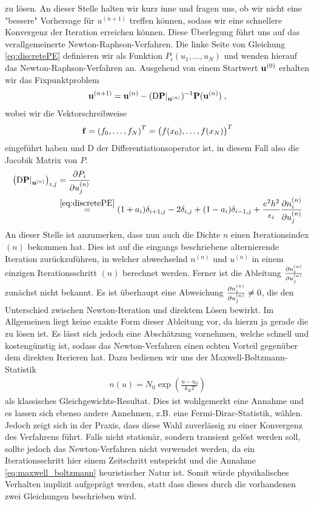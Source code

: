 zu lösen. An dieser Stelle halten wir kurz inne und fragen uns, ob wir nicht eine "bessere" Vorhersage für $u^{(n+1)}$ treffen können, sodass wir eine schnellere Konvergenz der Iteration erreichen können. Diese Überlegung führt uns auf das verallgemeinerte Newton-Raphson-Verfahren.
Die linke Seite von Gleichung \eqref{eq:discretePE} definieren wir als Funktion $P_i(u_1,\dots,u_N)$ und wenden hierauf das Newton-Raphson-Verfahren an. Ausgehend von einem Startwert $\vb{u}^{(0)}$ erhalten wir das Fixpunktproblem
\begin{align}
  \vb{u}^{(n+1)} = \vb{u}^{(n)} - (\mathrm{D}\vb{P}|_{\vb{u}^{(n)}})^{-1} \vb{P}(\vb{u}^{(n)}) \; ,
  \label{eq:fixpunkt_gummel}
\end{align}
wobei wir die Vektorschreibweise
\begin{align}
  \vb{f} = \left( f_0,\dots,f_N\right)^T = \left( f(x_0),\dots,f(x_N)\right)^T
\end{align}
eingeführt haben und $\mathrm{D}$ der Differentiationsoperator ist, in diesem Fall also die Jacobik Matrix von $P$.
\begin{align}
  \left(\mathrm{D}\vb{P}|_{\vb{u}^{(n)}}\right)_{i,j} &= \frac{\mathrm{\partial}P_i}{\mathrm{\partial}u_j^{(n)}} \\ &\stackrel{\eqref{eq:discretePE}}{=}
  (1+a_i)\delta_{i+1,j} - 2 \delta_{i,j} + (1-a_i)\delta_{i-1,j} + \frac{e^2h^2}{\epsilon_i}\frac{\mathrm{\partial}n_i^{(n)}}{\mathrm{\partial}u_j^{(n)}}
\end{align}
An dieser Stelle ist anzumerken, dass nun auch die Dichte $n$ einen Iterationsindex $(n)$ bekommen hat. Dies ist auf die eingangs beschriebene alternierende Iteration zurückzuführen, in welcher abwechselnd $n^{(n)}$ und $u^{(n)}$ in einem einzigen Iterationsschritt $(n)$ berechnet werden. Ferner ist die Ableitung $\frac{\mathrm{\partial}n_i^{(n)}}{\mathrm{\partial}u_j^{(n)}}$ zunächst nicht bekannt.
Es ist überhaupt eine Abweichung $\frac{\mathrm{\partial}n_i^{(n)}}{\mathrm{\partial}u_j^{(n)}} \neq 0$, die den Unterschied zwischen Newton-Iteration und direktem Lösen bewirkt. Im Allgemeinen liegt keine exakte Form dieser Ableitung vor, da hierzu ja gerade die \lvn zu lösen ist. Es lässt sich jedoch eine Abschätzung vornehmen, welche schnell und kostengünstig ist, sodass das Newton-Verfahren einen echten Vorteil gegenüber dem direkten Iterieren hat. Dazu bedienen wir uns der Maxwell-Boltzmann-Statistik
\begin{align}
  n(u) = N_0\exp\left(\frac{u-u_0}{k_B T}\right)
  \label{eq:maxwell_boltzmann}
\end{align}
als klassisches Gleichgewichts-Resultat. Dies ist wohlgemerkt eine Annahme und es lassen sich ebenso andere Annehmen, z.B. eine Fermi-Dirac-Statistik, wählen. Jedoch zeigt sich in der Praxis, dass diese Wahl zuverlässig zu einer Konvergenz des Verfahrens führt. Falls nicht stationär, sondern transient gelöst werden soll, sollte jedoch das Newton-Verfahren nicht verwendet werden, da ein Iterationsschritt hier einem Zeitschritt entspricht und die Annahme \eqref{eq:maxwell_boltzmann} heuristischer Natur ist. Somit würde physikalisches Verhalten implizit aufgeprägt werden, statt dass dieses durch die vorhandenen zwei Gleichungen beschrieben wird.

